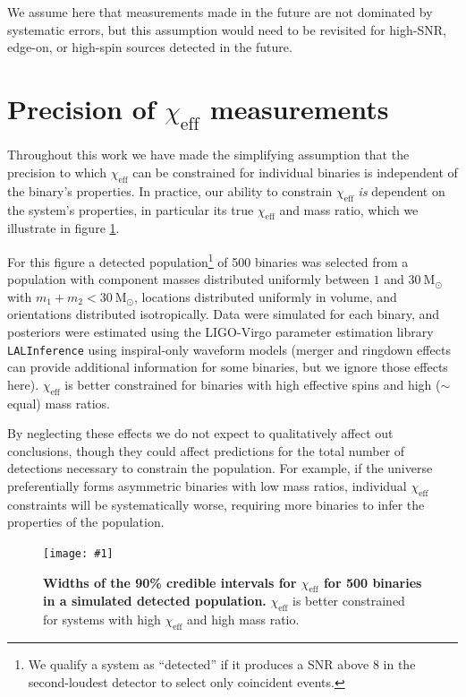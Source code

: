 \documentclass{nature}
\newcommand{\chieff}{\chi_\mathrm{eff}}
\newcommand{\plotone}[1]{\texttt{[image: \#1]}}
\begin{document}
\begin{methods}
We assume here that measurements made in the future are not dominated
by systematic errors, but this assumption would need to be revisited
for high-SNR, edge-on, or high-spin sources detected in the future.

\section{Precision of $\chieff$ measurements}
\label{sec:chi-eff-precision}
Throughout this work we have made the simplifying assumption that the
precision to which $\chieff$ can be constrained for individual binaries
is independent of the binary's properties.  In practice, our ability to
constrain $\chieff$ \emph{is} dependent on the system's properties, in
particular its true $\chieff$ and mass ratio, which we illustrate in
figure \ref{fig:chi-eff-constraints}.

For this figure a detected population\footnote{We qualify a system as
  ``detected'' if it produces a SNR above $8$ in the second-loudest
  detector to select only coincident events.} of 500 binaries was
selected from a population with component masses distributed uniformly
between $1$ and $30~\mathrm{M}_\odot$ with
$m_1 + m_2 < 30~\mathrm{M}_\odot$, locations distributed uniformly in
volume, and orientations distributed isotropically.  Data were
simulated for each binary, and posteriors were estimated using the
LIGO-Virgo parameter estimation library
\texttt{LALInference}\cite{2015PhRvD..91d2003V} using inspiral-only
waveform models (merger and ringdown effects can provide additional
information for some binaries, but we ignore those effects here).
$\chieff$ is better constrained for binaries with high
effective spins and high ($\sim$equal) mass ratios.

By neglecting these effects we do not expect to qualitatively affect
out conclusions, though they could affect predictions for the total
number of detections necessary to constrain the population.  For
example, if the universe preferentially forms asymmetric binaries with
low mass ratios, individual $\chieff$ constraints will be systematically
worse, requiring more binaries to infer the properties
of the population.

\begin{figure}
  \plotone{../plots/chi-eff-90cl}
  \caption{\textbf{Widths of the 90\% credible intervals for $\chieff$
      for 500 binaries in a simulated detected population.} $\chieff$
    is better constrained for systems with high $\chieff$ and high mass
    ratio.}
  \label{fig:chi-eff-constraints}
\end{figure}

\end{methods}



\end{document}
